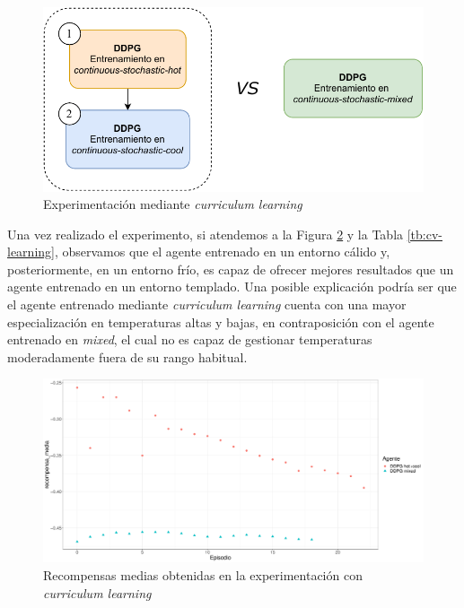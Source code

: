 \begin{figure}
    \centering
    \includegraphics[width=\textwidth]{imagenes/cv-learning.pdf}
    \caption{Experimentación mediante \textit{curriculum learning}}
    \label{fig:cv-learning}
\end{figure}

Una vez realizado el experimento, si atendemos a la Figura \ref{fig:cv-learning-recompensa}  y la Tabla \ref{tb:cv-learning}, observamos que el agente entrenado en un entorno cálido y, posteriormente, en un entorno frío, es capaz de ofrecer mejores resultados que un agente entrenado en un entorno templado. Una posible explicación podría ser que el agente entrenado mediante \textit{curriculum learning} cuenta con una mayor especialización en temperaturas altas y bajas, en contraposición con el agente entrenado en \textit{mixed}, el cual no es capaz de gestionar temperaturas moderadamente fuera de su rango habitual.

\begin{figure}
    \centering
    \includegraphics[width=\textwidth]{imagenes/recompensa-cv-learning.pdf}
    \caption{Recompensas medias obtenidas en la experimentación con \textit{curriculum learning}}
    \label{fig:cv-learning-recompensa}
\end{figure}

